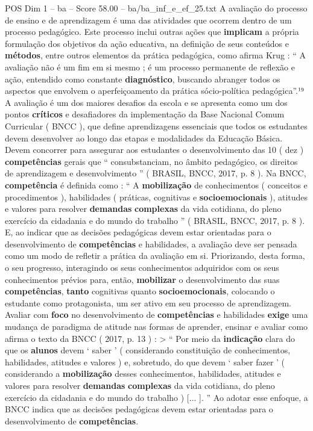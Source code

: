 \begin{textsample}{POS Dim 1 – ba – Score 58.00 – ba/ba\_inf\_e\_ef\_25.txt}
A avaliação do processo de ensino e de aprendizagem é uma das atividades que ocorrem dentro de um processo pedagógico.
Este processo inclui outras ações que \textbf{implicam} a própria formulação dos objetivos da ação educativa, na definição de seus conteúdos e \textbf{métodos}, entre outros elementos da prática pedagógica, como afirma Krug : “ A avaliação não é um fim em si mesmo ; é um processo permanente de reflexão e ação, entendido como constante \textbf{diagnóstico}, buscando abranger todos os aspectos que envolvem o aperfeiçoamento da prática sócio-política pedagógica”.¹⁹ A avaliação é um dos maiores desafios da escola e se apresenta como um dos pontos \textbf{críticos} e desafiadores da implementação da Base Nacional Comum Curricular ( BNCC ), que define aprendizagens essenciais que todos os estudantes devem desenvolver ao longo das etapas e modalidades da Educação Básica.
Devem concorrer para assegurar aos estudantes o desenvolvimento das 10 ( dez ) \textbf{competências} gerais que “ consubstanciam, no âmbito pedagógico, os direitos de aprendizagem e desenvolvimento ” ( BRASIL, BNCC, 2017, p. 8 ).
Na BNCC, \textbf{competência} é definida como : “ A \textbf{mobilização} de conhecimentos ( conceitos e procedimentos ), habilidades ( práticas, cognitivas e \textbf{socioemocionais} ), atitudes e valores para resolver \textbf{demandas} \textbf{complexas} da vida cotidiana, do pleno exercício da cidadania e do mundo do trabalho ” ( BRASIL, BNCC, 2017, p. 8 ).
E, ao indicar que as decisões pedagógicas devem estar orientadas para o desenvolvimento de \textbf{competências} e habilidades, a avaliação deve ser pensada como um modo de refletir a prática da avaliação em si.
Priorizando, desta forma, o seu progresso, interagindo os seus conhecimentos adquiridos com os seus conhecimentos prévios para, então, \textbf{mobilizar} o desenvolvimento das suas \textbf{competências}, \textbf{tanto} cognitivas quanto \textbf{socioemocionais}, colocando o estudante como protagonista, um ser ativo em seu processo de aprendizagem.
Avaliar com \textbf{foco} no desenvolvimento de \textbf{competências} e habilidades \textbf{exige} uma mudança de paradigma de atitude nas formas de aprender, ensinar e avaliar como afirma o texto da BNCC ( 2017, p. 13 ) : > “ Por meio da \textbf{indicação} clara do que os \textbf{alunos} devem ‘ saber ’ ( considerando constituição de conhecimentos, habilidades, atitudes e valores ) e, sobretudo, do que devem ‘ saber fazer ’ ( considerando a \textbf{mobilização} desses conhecimentos, habilidades, atitudes e valores para resolver \textbf{demandas} \textbf{complexas} da vida cotidiana, do pleno exercício da cidadania e do mundo do trabalho ) [... ]. ” Ao adotar esse enfoque, a BNCC indica que as decisões pedagógicas devem estar orientadas para o desenvolvimento de \textbf{competências}.

\end{textsample}
